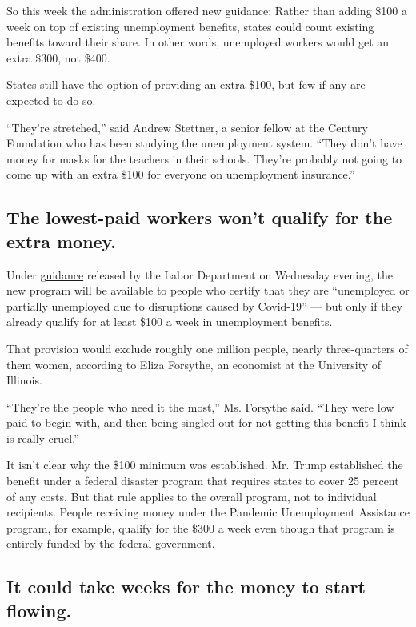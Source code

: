 So this week the administration offered new guidance: Rather than adding
\$100 a week on top of existing unemployment benefits, states could
count existing benefits toward their share. In other words, unemployed
workers would get an extra \$300, not \$400.

States still have the option of providing an extra \$100, but few if any
are expected to do so.

``They're stretched,'' said Andrew Stettner, a senior fellow at the
Century Foundation who has been studying the unemployment system. ``They
don't have money for masks for the teachers in their schools. They're
probably not going to come up with an extra \$100 for everyone on
unemployment insurance.''

\hypertarget{the-lowest-paid-workers-wont-qualify-for-the-extra-money}{%
\subsection{The lowest-paid workers won't qualify for the extra
money.}\label{the-lowest-paid-workers-wont-qualify-for-the-extra-money}}

Under
\href{https://wdr.doleta.gov/directives/attach/UIPL/UIPL_27-20.pdf}{guidance}
released by the Labor Department on Wednesday evening, the new program
will be available to people who certify that they are ``unemployed or
partially unemployed due to disruptions caused by Covid-19'' --- but
only if they already qualify for at least \$100 a week in unemployment
benefits.

That provision would exclude roughly one million people, nearly
three-quarters of them women, according to Eliza Forsythe, an economist
at the University of Illinois.

``They're the people who need it the most,'' Ms. Forsythe said. ``They
were low paid to begin with, and then being singled out for not getting
this benefit I think is really cruel.''

It isn't clear why the \$100 minimum was established. Mr. Trump
established the benefit under a federal disaster program that requires
states to cover 25 percent of any costs. But that rule applies to the
overall program, not to individual recipients. People receiving money
under the Pandemic Unemployment Assistance program, for example, qualify
for the \$300 a week even though that program is entirely funded by the
federal government.

\hypertarget{it-could-take-weeks-for-the-money-to-start-flowing}{%
\subsection{It could take weeks for the money to start
flowing.}\label{it-could-take-weeks-for-the-money-to-start-flowing}}

